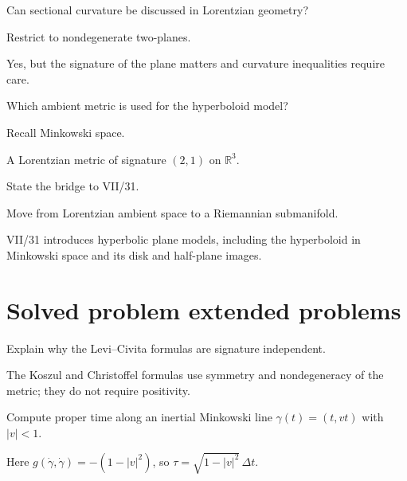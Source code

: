 \begin{exercise}\label{exr:vii30-22}
Can sectional curvature be discussed in Lorentzian geometry?
\end{exercise}
\begin{hint}
Restrict to nondegenerate two-planes.
\end{hint}
\begin{solution}
Yes, but the signature of the plane matters and curvature inequalities require care.
\end{solution}

\begin{exercise}\label{exr:vii30-23}
Which ambient metric is used for the hyperboloid model?
\end{exercise}
\begin{hint}
Recall Minkowski space.
\end{hint}
\begin{solution}
A Lorentzian metric of signature \((2,1)\) on \(\mathbb R^3\).
\end{solution}

\begin{exercise}\label{exr:vii30-24}
State the bridge to VII/31.
\end{exercise}
\begin{hint}
Move from Lorentzian ambient space to a Riemannian submanifold.
\end{hint}
\begin{solution}
VII/31 introduces hyperbolic plane models, including the hyperboloid in Minkowski space and its disk and half-plane images.
\end{solution}

\section{Solved problem extended problems}
\begin{problem}\label{prob:vii30-01}
Explain why the Levi--Civita formulas are signature independent.
\end{problem}
\begin{solution}
The Koszul and Christoffel formulas use symmetry and nondegeneracy of the metric; they do not require positivity.
\end{solution}

\begin{problem}\label{prob:vii30-02}
Compute proper time along an inertial Minkowski line \(\gamma(t)=(t,vt)\) with \(|v|<1\).
\end{problem}
\begin{solution}
Here \(g(\dot\gamma,\dot\gamma)=-(1-|v|^2)\), so \(\tau=\sqrt{1-|v|^2}\,\Delta t\).
\end{solution}

